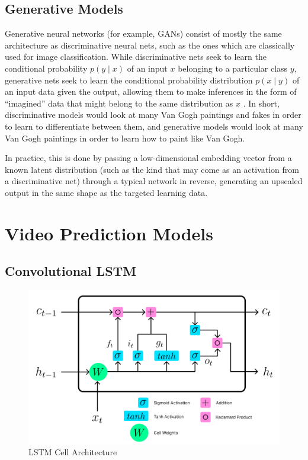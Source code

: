 \documentclass{scrartcl}
\begin{document}
\subsection{Generative Models}
\label{subsec:generative}

Generative neural networks (for example, GANs) consist of mostly the same
architecture as discriminative neural nets, such as the ones which are
classically used for image classification. While discriminative nets seek to
learn the conditional probability $p(y \mid x)$ of an input $x$ belonging to a
particular class $y$, generative nets seek to learn the conditional probability
distribution $p(x \mid y)$ of an input data given the output, allowing them to
make inferences in the form of ``imagined'' data that might belong to the same
distribution as $x$ \cite{gan_original}. In short, discriminative models would
look at many Van Gogh paintings and fakes in order to learn to differentiate
between them, and generative models would look at many Van Gogh paintings in
order to learn how to paint like Van Gogh.

In practice, this is done by passing a low-dimensional embedding vector from a
known latent distribution (such as the kind that may come as an activation from
a discriminative net) through a typical network in reverse, generating an
upscaled output in the same shape as the targeted learning data.

\section{Video Prediction Models}
\label{sec:families}

\subsection{Convolutional LSTM}
\label{subsec:conv_lstm}

\begin{figure}[H]
	\begin{center}
		\includegraphics[width=1\textwidth]{figures/lstmcell_arch.png}
	\end{center}
	\caption{LSTM Cell Architecture}
	\label{fig:rnn_arch}
\end{figure}
\end{document}
